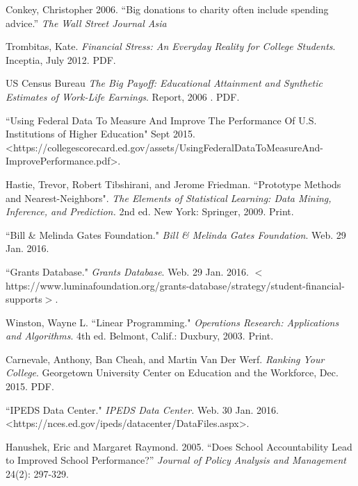 \documentclass[12pt]{scrartcl}
\begin{document}
\begin{thebibliography}{10}
	 Conkey, Christopher 2006. ``Big donations to charity often include spending advice.” \emph{The Wall Street Journal Asia} 
	
	 Trombitas, Kate.  \emph{Financial Stress: An Everyday Reality for College Students}. Inceptia, July 2012. PDF.
	
	 US Census Bureau  \emph{The Big Payoff: Educational Attainment and Synthetic Estimates of Work-Life Earnings}. Report, 2006 . PDF. 

	 ``Using Federal Data To Measure And Improve The Performance Of U.S. Institutions of Higher Education" Sept 2015. \textless https://collegescorecard.ed.gov/assets/UsingFederalDataToMeasureAnd- \\ImprovePerformance.pdf\textgreater.
	
	 Hastie, Trevor, Robert Tibshirani, and Jerome Friedman. ``Prototype Methods and Nearest-Neighbors". \emph{The Elements of Statistical Learning: Data Mining, Inference, and Prediction.} 2nd ed. New York: Springer, 2009. Print. 
	
	 ``Bill \& Melinda Gates Foundation." \emph{Bill \& Melinda Gates Foundation}. Web. 29 Jan. 2016. 
	
	 ``Grants Database." \emph{Grants Database}. Web. 29 Jan. 2016. $<$https://www.luminafoundation.org/grants-database/strategy/student-financial-supports$>$. 
	
	 Winston, Wayne L. ``Linear Programming."  \emph{Operations Research: Applications and Algorithms}. 4th ed. Belmont, Calif.: Duxbury, 2003. Print.
	
	 Carnevale, Anthony, Ban Cheah, and Martin Van Der Werf. \emph{Ranking Your College}. Georgetown University Center on Education and the Workforce, Dec. 2015. PDF.	

	 ``IPEDS Data Center." \emph{IPEDS Data Center.} Web. 30 Jan. 2016. \textless https://nces.ed.gov/ipeds/datacenter/DataFiles.aspx\textgreater.

	 Hanushek, Eric and Margaret Raymond. 2005. ``Does School Accountability Lead to Improved School Performance?” \emph{Journal of Policy Analysis and Management} 24(2): 297-329.
	
	
	
\end{thebibliography}
\end{document}
